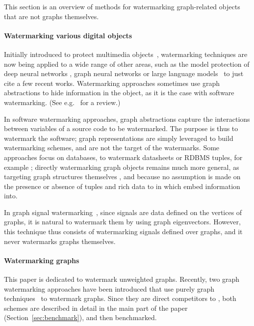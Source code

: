 This section is an overview of methods for watermarking graph-related objects that are not graphs themselves.

\paragraph*{Watermarking various digital objects}
Initially introduced to protect multimedia objects~\cite{560423,TIP}, watermarking techniques are now being applied to a wide range of other areas, such as the model protection of deep neural networks \cite{le2020adversarial}, graph neural networks \cite{zhao2021watermarking} or large language models~\cite{kirchenbauer2023watermark} to just cite a few recent works. Watermarking approaches sometimes use graph abstractions to hide information in the object, as it is the case with software watermarking. (See e.g.~\cite{dey2019software} for a review.)
\par In software watermarking approaches, graph abstractions capture the interactions between variables of a source code to be watermarked. The purpose is thus to watermark the software; graph representations are simply leveraged to build watermarking schemes, and are not the target of the watermarks. Some approaches focus on databases, to watermark datasheets or RDBMS tuples, for example \cite{agrawal2002watermarking,cudre2011graph,kumar2020recent}; directly watermarking graph objects remains much more general, as targeting graph structures themselves \cite{COSN,isc}, and because no assumption is made on the presence or absence of tuples and rich data to in which embed information into.
\par In graph signal watermarking~\cite{icassp}, since signals are data defined on the vertices of graphs, it is natural to watermark them by using graph eigenvectors. However, this technique thus consists of watermarking signals defined over graphs, and it never watermarks graphs themselves.

\paragraph*{Watermarking graphs}

This paper is dedicated to watermark unweighted graphs.
Recently, two graph watermarking approaches have been introduced that use purely graph techniques~\cite{isc,COSN} to watermark graphs. Since they are direct competitors to \scheme, both schemes are described in detail in the main part of the paper (Section~\ref{sec:benchmark}), and then benchmarked.

